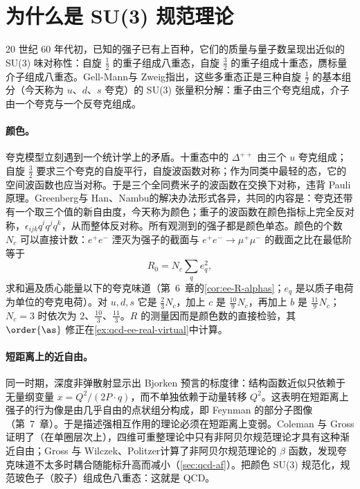 \section{为什么是 SU(3) 规范理论}\label{sec:qcd-why}

20 世纪 60 年代初，已知的强子已有上百种，它们的质量与量子数呈现出近似的 SU(3) 味对称性：自旋 $\frac12$ 的重子组成八重态，自旋 $\frac32$ 的重子组成十重态，赝标量介子组成八重态。Gell-Mann\cite{Gell-Mann:1964ewy}与 Zweig\cite{Zweig:1964jf}指出，这些多重态正是三种自旋 $\frac12$ 的基本组分（今天称为 $u$、$d$、$s$ 夸克）的 SU(3) 张量积分解：重子由三个夸克组成，介子由一个夸克与一个反夸克组成。

\paragraph{颜色。}夸克模型立刻遇到一个统计学上的矛盾。十重态中的 $\Delta^{++}$ 由三个 $u$ 夸克组成；自旋 $\frac32$ 要求三个夸克的自旋平行，自旋波函数对称；作为同类中最轻的态，它的空间波函数也应当对称。于是三个全同费米子的波函数在交换下对称，违背 Pauli 原理。Greenberg\cite{Greenberg:1964pe}与 Han、Nambu\cite{Han:1965pf}的解决办法形式各异，共同的内容是：夸克还带有一个取三个值的新自由度，今天称为颜色；重子的波函数在颜色指标上完全反对称，$\epsilon_{ijk}q^iq^jq^k$，从而整体反对称。所有观测到的强子都是颜色单态。颜色的个数 $N_c$ 可以直接计数：$e^+e^-$ 湮灭为强子的截面与 $e^+e^-\to\mu^+\mu^-$ 的截面之比在最低阶等于
\begin{equation}\label{eq:qcd-R0}
R_0=N_c\sum_qe_q^2 ,
\end{equation}
求和遍及质心能量以下的夸克味道（第~6~章的\cref{cor:ee-R-alphas}；$e_q$ 是以质子电荷为单位的夸克电荷）。对 $u,d,s$ 它是 $\frac23N_c$，加上 $c$ 是 $\frac{10}9N_c$，再加上 $b$ 是 $\frac{11}9N_c$；$N_c=3$ 时依次为 $2$、$\frac{10}3$、$\frac{11}3$。$R$ 的测量因而是颜色数的直接检验，其 $\order{\as}$ 修正在\cref{ex:qcd-ee-real-virtual}中计算。

\paragraph{短距离上的近自由。}同一时期，深度非弹散射显示出 Bjorken 预言的标度律\cite{Bjorken1969}：结构函数近似只依赖于无量纲变量 $x=Q^2/(2P\cdot q)$，而不单独依赖于动量转移 $Q^2$。这表明在短距离上强子的行为像是由几乎自由的点状组分构成，即 Feynman 的部分子图像\cite{Feynman1969}（第~7~章）。于是描述强相互作用的理论必须在短距离上变弱。Coleman 与 Gross\cite{Coleman:1973sx}证明了（在单圈层次上），四维可重整理论中只有非阿贝尔规范理论才具有这种渐近自由；Gross 与 Wilczek\cite{GrossWilczek1973a}、Politzer\cite{Politzer1973}计算了非阿贝尔规范理论的 $\beta$ 函数，发现夸克味道不太多时耦合随能标升高而减小（\cref{sec:qcd-af}）。把颜色 SU(3) 规范化，规范玻色子（胶子）组成色八重态\cite{Fritzsch:1973pi}：这就是 QCD。

